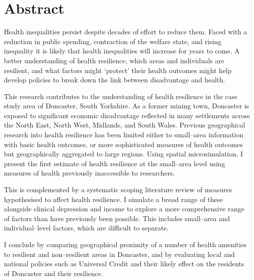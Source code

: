 \chapter*{Abstract}

Health inequalities persist despite decades of effort to reduce them.
Faced with a reduction in public spending, contraction of the welfare state, and rising inequality it is likely that health inequalities will increase for years to come.
A better understanding of health resilience, which areas and individuals are resilient, and what factors might `protect' their health outcomes might help develop policies to break down the link between disadvantage and health.

This research contributes to the understanding of health resilience in the case study area of Doncaster, South Yorkshire.
As a former mining town, Doncaster is exposed to significant economic disadvantage reflected in many settlements across the North East, North West, Midlands, and South Wales.
Previous geographical research into health resilience has been limited either to small--area information with basic health outcomes, or more sophisticated measures of health outcomes but geographically aggregated to large regions.
Using spatial microsimulation, I present the first estimate of health resilience at the small--area level using measures of health previously inaccessible to researchers.

This is complemented by a systematic scoping literature review of measures hypothesised to affect health resilience.
I simulate a broad range of these alongside clinical depression and income to explore a more comprehensive range of factors than have previously been possible.
This includes small--area and individual--level factors, which are difficult to separate.

I conclude by comparing geographical proximity of a number of health amenities to resilient and non--resilient areas in Doncaster, and by evaluating local and national policies such as Universal Credit and their likely effect on the residents of Doncaster and their resilience.
